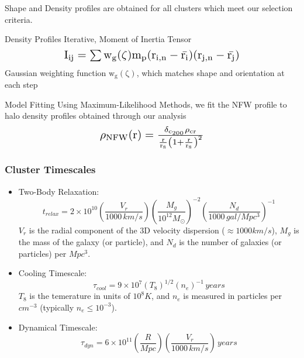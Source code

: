 \documentclass[hyperref={pdfpagelabels=false}]{beamer}
\begin{document}
\begin{frame}
 Shape and Density profiles are obtained for all clusters which meet
 our selection criteria.
      \begin{block}{\centering Density Profiles}
       Iterative, Moment of Inertia Tensor
       \[ \scalebox{1.4}{$\mathrm{I_{ij} = \sum w_{g}(\zeta) m_{p} (r_{i,n} -
       \bar{r_{i}}) (r_{j,n} - \bar{r_{j}})}$} \]
       Gaussian weighting function $\mathrm{w_{g} (\zeta)}$, which matches
       shape and orientation at each step
      \end{block}
      \begin{block}{\centering Model Fitting}
        Using Maximum-Likelihood Methods, we fit the NFW profile to
        halo density profiles obtained through our analysis
        \[ \scalebox{1.4}{$\mathrm{\rho_{NFW} (r) =
        \frac{\delta_{c_{200}}\rho_{cr}}{\frac{r}{r_{s}} \left(1+ \frac{r}{r_{s}}\right)^{2}}}$} \]
      \end{block}
\end{frame}

\begin{frame}
\frametitle{Cluster Timescales}
\begin{itemize}
\item {\tiny Two-Body Relaxation:
\[ t_{relax} = 2\times 10^{10} \left( \frac{V_{r}}{1000\,km/s} \right) \left(
  \frac{M_{g}}{10^{12} M_{\odot}} \right)^{-2} \left(
  \frac{N_{d}}{1000\,gal/Mpc^{3}} \right)^{-1}\]
$V_{r}$ is the radial component of the 3D velocity dispersion ($\approx 1000
km/s$), $M_{g}$ is the mass of the galaxy (or particle), and $N_{d}$ is the
number of galaxies (or particles) per $Mpc^{3}$.}
\item {\tiny Cooling Timescale: 
\[ \tau_{cool} = 9\times 10^{7} \left( T_{8} \right)^{1/2} \left( n_{e}
\right)^{-1} \,years\]
$T_{8}$ is the temerature in units of $10^{8}K$, and $n_{e}$ is measured in
particles per $cm^{-3}$ (typically $n_{e} \le 10^{-3}$)}.
\item {\tiny Dynamical Timescale:
\[ \tau_{dyn} = 6\times10^{11} \left( \frac{R}{Mpc}\right) \left(
  \frac{V_{r}}{1000\,km/s} \right) \, years \] }
\end{itemize}
\end{frame}
\end{document}
